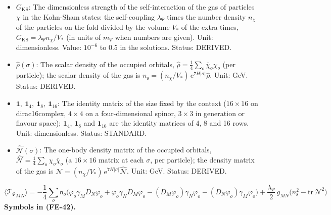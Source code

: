\documentclass[
  10pt,
]{article}
\begin{document}
\begin{itemize}
  Kohn-Sham equation of the gas: the \(16 \times 16\) matrix
  \(\lambda_\Psi(n_{\mathrm{s}}\mathbf{1} - \mathcal{N})\) at each
  \(\sigma\), which adds to the mass \(m_\Psi\); positive (repulsive)
  for \(\lambda_\Psi > 0\). Unit: GeV. Status: DERIVED.
\item
  \(G_{\mathrm{KS}}\): The dimensionless strength of the
  self-interaction of the gas of particles \(\chi\) in the Kohn-Sham
  states: the self-coupling \(\lambda_\Psi\) times the number density
  \(n_\chi\) of the particles on the fold divided by the volume \(V_*\)
  of the extra times, \(G_{\mathrm{KS}} = \lambda_\Psi n_\chi/V_*\) (in
  units of \(m_\Psi\) when numbers are given). Unit: dimensionless.
  Value: \(10^{-6}\) to 0.5 in the solutions. Status: DERIVED.
\item
  \(\hat\rho(\sigma)\): The scalar density of the occupied orbitals,
  \(\hat\rho = \frac14\sum_o\bar\chi_o\chi_o\) (per particle); the
  scalar density of the gas is
  \(n_{\mathrm{s}} = (n_\chi/V_*)\,\mathrm{e}^{7H\lvert\sigma\rvert}\hat\rho\).
  Unit: GeV. Status: DERIVED.
\item
  \(\mathbf{1},\ \mathbf{1}_4,\ \mathbf{1}_8,\ \mathbf{1}_{16}\): The
  identity matrix of the size fixed by the context (\(16 \times 16\) on
  dirac16complex, \(4 \times 4\) on a four-dimensional spinor,
  \(3 \times 3\) in generation or flavour space); \(\mathbf{1}_4\),
  \(\mathbf{1}_8\) and \(\mathbf{1}_{16}\) are the identity matrices of
  4, 8 and 16 rows. Unit: dimensionless. Status: STANDARD.
\item
  \(\hat{\mathcal{N}}(\sigma)\): The one-body density matrix of the
  occupied orbitals,
  \(\hat{\mathcal{N}} = \frac14\sum_o\chi_o\bar\chi_o\) (a
  \(16 \times 16\) matrix at each \(\sigma\), per particle); the density
  matrix of the gas is
  \(\mathcal{N} = (n_\chi/V_*)\,\mathrm{e}^{7H\lvert\sigma\rvert}\hat{\mathcal{N}}\).
  Unit: GeV. Status: DERIVED.
\end{itemize}

\[
\langle{\mathcal{T}_\Psi}_{MN}\rangle = -\frac14\sum_o\mathsf{n}_o\Big(\bar\varphi_o\gamma_MD_N\varphi_o + \bar\varphi_o\gamma_ND_M\varphi_o
 - (D_M\bar\varphi_o)\gamma_N\varphi_o - (D_N\bar\varphi_o)\gamma_M\varphi_o\Big) + \frac{\lambda_\Psi}{2}\,g_{MN}\big(n_{\mathrm{s}}^2 - \mathrm{tr}\,\mathcal{N}^2\big) \tag{FE-42}
\] \textbf{Symbols in (FE-42).}
\end{document}

